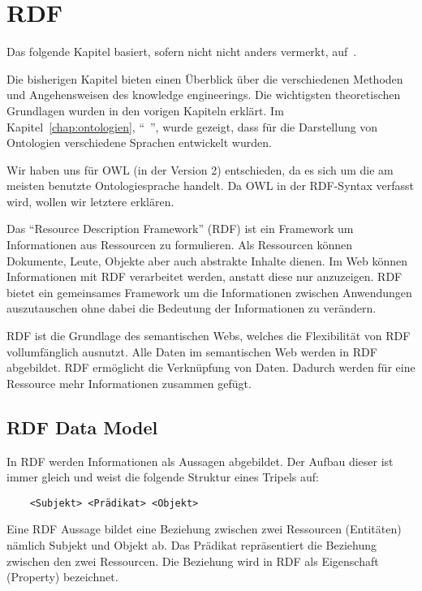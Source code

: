 \chapter{RDF}
\label{chap:rdf}
Das folgende Kapitel basiert, sofern nicht nicht anders vermerkt, auf~\cite{w3rdf}.

Die bisherigen Kapitel bieten einen Überblick über die verschiedenen Methoden und Angehensweisen des knowledge engineerings. Die wichtigsten theoretischen Grundlagen wurden in den vorigen Kapiteln erklärt. Im Kapitel~\ref{chap:ontologien}, ``~'', wurde gezeigt, dass für die Darstellung von Ontologien verschiedene Sprachen entwickelt wurden. 

Wir haben uns für OWL (in der Version 2) entschieden, da es sich um die am meisten benutzte Ontologiesprache handelt. Da OWL in der RDF-Syntax verfasst wird, wollen wir letztere erklären.

Das ``Resource Description Framework'' (RDF) ist ein Framework um Informationen aus Ressourcen zu formulieren. Als Ressourcen können Dokumente, Leute, Objekte aber auch abstrakte Inhalte dienen. Im Web können Informationen mit RDF verarbeitet werden, anstatt diese nur anzuzeigen. RDF bietet ein gemeinsames Framework um die Informationen zwischen Anwendungen auszutauschen ohne dabei die Bedeutung der Informationen zu verändern.

RDF ist die Grundlage des semantischen Webs, welches die Flexibilität von RDF vollumfänglich ausnutzt. Alle Daten im semantischen Web werden in RDF abgebildet. RDF ermöglicht die Verknüpfung von Daten. Dadurch werden für eine Ressource mehr Informationen zusammen gefügt.\cite{cambSemRDF}

\section{RDF Data Model}
\label{sec:rdf_rdf_dataModel}
In RDF werden Informationen als Aussagen abgebildet. Der Aufbau dieser ist immer gleich und weist die folgende Struktur eines Tripels auf:

\begin{lstlisting}
    <Subjekt> <Prädikat> <Objekt>
\end{lstlisting}

Eine RDF Aussage bildet eine Beziehung zwischen zwei Ressourcen (Entitäten) nämlich Subjekt und Objekt ab. Das Prädikat repräsentiert die Beziehung zwischen den zwei Ressourcen. Die Beziehung wird in RDF als Eigenschaft (Property) bezeichnet.

